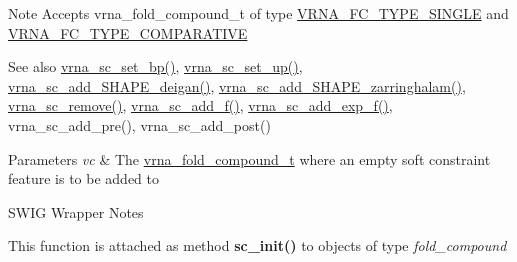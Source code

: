 \begin{DoxyNote}{Note}
Accepts vrna\+\_\+fold\+\_\+compound\+\_\+t of type \mbox{\hyperlink{group__fold__compound_gga01a4ff86fa71deaaa5d1abbd95a1447da7e264dd3cf2dc9b6448caabcb7763cd6}{V\+R\+N\+A\+\_\+\+F\+C\+\_\+\+T\+Y\+P\+E\+\_\+\+S\+I\+N\+G\+LE}} and \mbox{\hyperlink{group__fold__compound_gga01a4ff86fa71deaaa5d1abbd95a1447dab821ce46ea3cf665be97df22a76f5023}{V\+R\+N\+A\+\_\+\+F\+C\+\_\+\+T\+Y\+P\+E\+\_\+\+C\+O\+M\+P\+A\+R\+A\+T\+I\+VE}}
\end{DoxyNote}
\begin{DoxySeeAlso}{See also}
\mbox{\hyperlink{group__soft__constraints_ga8e4334b24bc91453fbcda490a4e331af}{vrna\+\_\+sc\+\_\+set\+\_\+bp()}}, \mbox{\hyperlink{group__soft__constraints_ga99ed63f3ef9e7fe3997932030487a344}{vrna\+\_\+sc\+\_\+set\+\_\+up()}}, \mbox{\hyperlink{group___s_h_a_p_e__reactivities_ga57d612b58e1c61dd6cfcb5a843f8f1b3}{vrna\+\_\+sc\+\_\+add\+\_\+\+S\+H\+A\+P\+E\+\_\+deigan()}}, \mbox{\hyperlink{group___s_h_a_p_e__reactivities_gaf3c65a045060aef5c4e41693d30af58c}{vrna\+\_\+sc\+\_\+add\+\_\+\+S\+H\+A\+P\+E\+\_\+zarringhalam()}}, \mbox{\hyperlink{group__soft__constraints_ga73cdc07b9a199c614367bebef0f2c41a}{vrna\+\_\+sc\+\_\+remove()}}, \mbox{\hyperlink{group__soft__constraints_ga8c7d907ec0125cd61c04e0908010a4e9}{vrna\+\_\+sc\+\_\+add\+\_\+f()}}, \mbox{\hyperlink{group__soft__constraints_ga87e382b5d0c9b7d9ce1b79c0473ff700}{vrna\+\_\+sc\+\_\+add\+\_\+exp\+\_\+f()}}, vrna\+\_\+sc\+\_\+add\+\_\+pre(), vrna\+\_\+sc\+\_\+add\+\_\+post() 
\end{DoxySeeAlso}

\begin{DoxyParams}{Parameters}
{\em vc} & The \mbox{\hyperlink{group__fold__compound_ga1b0cef17fd40466cef5968eaeeff6166}{vrna\+\_\+fold\+\_\+compound\+\_\+t}} where an empty soft constraint feature is to be added to\\
\hline
\end{DoxyParams}
\begin{DoxyRefDesc}{S\+W\+I\+G Wrapper Notes}
\item[\mbox{\hyperlink{wrappers__wrappers000015}{S\+W\+I\+G Wrapper Notes}}]This function is attached as method {\bfseries sc\+\_\+init()} to objects of type {\itshape fold\+\_\+compound} \end{DoxyRefDesc}
\mbox{\label{group__soft__constraints_ga8e4334b24bc91453fbcda490a4e331af}} 
